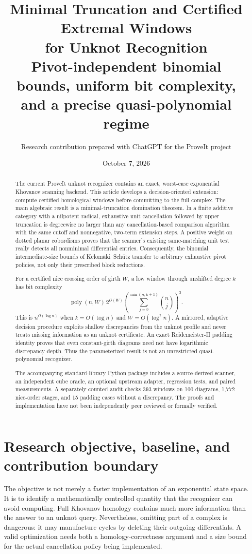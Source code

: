 \documentclass[11pt]{article}
\title{\textbf{Minimal Truncation and Certified Extremal Windows\\for Unknot Recognition}\\[5pt]
\large Pivot-independent binomial bounds, uniform bit complexity,\\and a precise quasi-polynomial regime}
\author{Research contribution prepared with ChatGPT for the ProveIt project}
\date{October 7, 2026}
\theoremstyle{definition}\newtheorem{definition}[theorem]{Definition}
\theoremstyle{remark}\newtheorem{remark}[theorem]{Remark}
\begin{document}
\maketitle
\begin{abstract}
The current ProveIt unknot recognizer contains an exact, worst-case exponential Khovanov scanning backend. This article develops a decision-oriented extension: compute certified homological windows before committing to the full complex. The main algebraic result is a minimal-truncation domination theorem. In a finite additive category with a nilpotent radical, exhaustive unit cancellation followed by upper truncation is degreewise no larger than any cancellation-based comparison algorithm with the same cutoff and nonnegative, two-term extension steps. A positive weight on dotted planar cobordisms proves that the scanner's existing same-matching unit test really detects all nonminimal differential entries. Consequently, the binomial intermediate-size bounds of Kelom\"aki--Sch\"utz transfer to arbitrary exhaustive pivot policies, not only their prescribed block reductions.

For a certified nice crossing order of girth $W$, a low window through unshifted degree $k$ has bit complexity
\[
 \operatorname{poly}(n,W)\,2^{O(W)}
 \left(\sum_{j=0}^{\min(n,k+1)}\binom nj\right)^3.
\]
This is $n^{O(\log n)}$ when $k=O(\log n)$ and $W=O(\log^2 n)$. A mirrored, adaptive decision procedure exploits shallow discrepancies from the unknot profile and never treats missing information as an unknot certificate. An exact Reidemeister-II padding identity proves that even constant-girth diagrams need not have logarithmic discrepancy depth. Thus the parameterized result is not an unrestricted quasi-polynomial recognizer.

The accompanying standard-library Python package includes a source-derived scanner, an independent cube oracle, an optional upstream adapter, regression tests, and paired measurements. A separately counted audit checks 393 windows on 100 diagrams, 1,772 nice-order stages, and 15 padding cases without a discrepancy. The proofs and implementation have not been independently peer reviewed or formally verified.
\end{abstract}
\clearpage
{\small\setlength{\parskip}{0pt}\tableofcontents}
\clearpage

\section{Research objective, baseline, and contribution boundary}
\label{sec:scope}
The objective is not merely a faster implementation of an exponential state space. It is to identify a mathematically controlled quantity that the recognizer can avoid computing. Full Khovanov homology contains much more information than the answer to an unknot query. Nevertheless, omitting part of a complex is dangerous: it may manufacture cycles by deleting their outgoing differentials. A valid optimization needs both a homology-correctness argument and a size bound for the actual cancellation policy being implemented.
\end{document}
